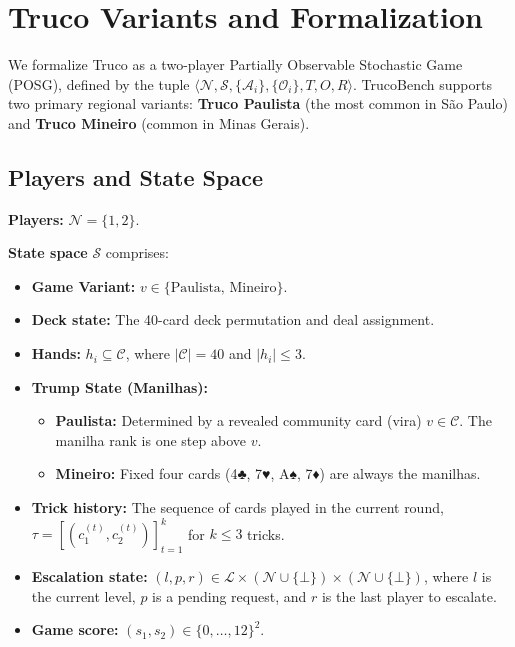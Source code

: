 \section{Truco Variants and Formalization}

We formalize Truco as a two-player Partially Observable Stochastic Game (POSG), defined by the tuple $\langle \mathcal{N}, \mathcal{S}, \{\mathcal{A}_i\}, \{\mathcal{O}_i\}, T, O, R \rangle$. TrucoBench supports two primary regional variants: \textbf{Truco Paulista} (the most common in São Paulo) and \textbf{Truco Mineiro} (common in Minas Gerais).

\subsection{Players and State Space}

\textbf{Players:} $\mathcal{N} = \{1, 2\}$.

\textbf{State space} $\mathcal{S}$ comprises:
\begin{itemize}
    \item \textbf{Game Variant:} $v \in \{\text{Paulista, Mineiro}\}$.
    \item \textbf{Deck state:} The 40-card deck permutation and deal assignment.
    \item \textbf{Hands:} $h_i \subseteq \mathcal{C}$, where $|\mathcal{C}| = 40$ and $|h_i| \leq 3$.
    \item \textbf{Trump State (Manilhas):}
        \begin{itemize}
            \item \textbf{Paulista:} Determined by a revealed community card (vira) $v \in \mathcal{C}$. The manilha rank is one step above $v$.
            \item \textbf{Mineiro:} Fixed four cards (4♣, 7♥, A♠, 7♦) are always the manilhas.
        \end{itemize}
    \item \textbf{Trick history:} The sequence of cards played in the current round, $\tau = [(c_1^{(t)}, c_2^{(t)})]_{t=1}^{k}$ for $k \leq 3$ tricks.
    \item \textbf{Escalation state:} $(l, p, r) \in \mathcal{L} \times (\mathcal{N} \cup \{\bot\}) \times (\mathcal{N} \cup \{\bot\})$, where $l$ is the current level, $p$ is a pending request, and $r$ is the last player to escalate.
    \item \textbf{Game score:} $(s_1, s_2) \in \{0, \ldots, 12\}^2$.
\end{itemize}

